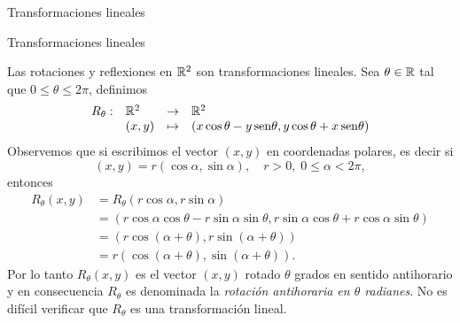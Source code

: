 \begin{chapter}{Transformaciones lineales}
\begin{section}{Transformaciones lineales}
            
            \begin{ejemplo} Las rotaciones y reflexiones en $\mathbb R^2$ son transformaciones lineales. Sea $\theta \in \mathbb R$ tal que  $0 \le \theta \le 2\pi$,  definimos
                \begin{equation*}
                    \begin{array}{llll}
                    R_\theta:&\mathbb R^2 &\to &\mathbb R^2 \\
                    &(x,y) &\mapsto & (x \cos\theta - y {\,\operatorname{sen}}\theta, y\cos\theta+ x{\,\operatorname{sen}}\theta)
                    \end{array}
                \end{equation*}
                Observemos que si escribimos el vector $(x,y)$  en coordenadas polares,  es decir  si 
                $$
                (x,y)= r(\cos\alpha,\sin\alpha),\quad r> 0, \; 0 \le \alpha < 2\pi, 
                $$
                entonces
                \begin{align*}
                    R_\theta(x,y) &= R_\theta(r\cos\alpha,r\sin\alpha) \\
                    &= (r\cos\alpha \cos\theta - r\sin\alpha \sin\theta, r\sin\alpha\cos\theta+ r\cos\alpha\sin\theta) \\
                    &= (r\cos(\alpha+\theta) , r\sin(\alpha+\theta)) \\
                    &= r(\cos(\alpha+\theta) , \sin(\alpha+\theta)).
                \end{align*}
                Por lo tanto $R_\theta(x,y)$ es el vector $(x,y)$ rotado $\theta$ grados en sentido antihorario y en consecuencia  $R_\theta$ es denominada la \textit{rotación antihoraria en $\theta$ radianes}. No es difícil verificar que $R_\theta$ es una transformación lineal. 
                

\end{ejemplo}
\end{section}
\end{chapter}
